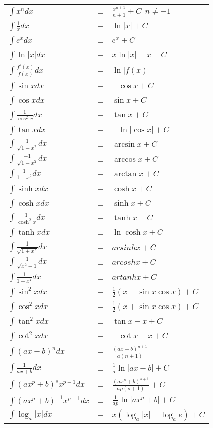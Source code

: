 \documentclass[10pt, a4paper, twocolumn]{scrartcl}
\begin{document}
\footnotesize
\begin{tabular}{lcl}
 $\int x^n dx$ & = &				$\frac{x^{n+1}}{n+1}+C\:\:n\neq -1$\\
 $\int \frac{1}{x} dx$ & = &			$\ln |x| +C$\\
 $\int e^x dx$ & = &				$e^x +C$\\
 $\int \ln |x| dx$ & = &			$x\ln |x| -x +C$\\
 $\int \frac{f'(x)}{f(x)}dx$ & = &		$\ln|f(x)|$\\
 $\int \sin x dx$ & = &				$-\cos x +C$\\
 $\int \cos x dx$ & = &				$\sin x +C$\\
 $\int \frac{1}{\cos^2 x}dx$ & = &		$\tan x +C$\\
 $\int \tan x dx$ & = &				$-\ln|\cos x|+C$\\
 $\int \frac{1}{\sqrt{1-x^2}}dx$ & = &	$\arcsin x +C$\\
 $\int \frac{-1}{\sqrt{1-x^2}}dx$ & = &	$\arccos x +C$\\
 $\int \frac{1}{1+x^2}dx$ & = &			$\arctan x +C$\\
 $\int \sinh x dx$ & = &			$\cosh x +C$\\
 $\int \cosh x dx$ & = &			$\sinh x +C$\\
 $\int \frac{1}{\cosh^2 x}dx$ & = &		$\tanh x +C$\\
 $\int \tanh x dx$ & = &			$\ln\cosh x + C$\\
 $\int \frac{1}{\sqrt{1+x^2}}dx$ & = &		$arsinh x + C$\\
 $\int \frac{1}{\sqrt{x^2-1}}dx$ & = &		$arcosh x + C$\\
 $\int \frac{1}{1-x^2}dx$ & = &			$artanh x + C$\\
 $\int \sin^2 x dx$ & = &			$\frac{1}{2}(x-\sin x \cos x) +C$\\
 $\int \cos^2 x dx$ & = &			$\frac{1}{2}(x+\sin x \cos x) +C$\\
 $\int \tan^2 x dx$ & = &			$\tan x-x +C$\\
 $\int \cot^2 x dx$ & = &			$-\cot x-x +C$\\
 $\int (ax+b)^ndx$ & = &			$\frac{(ax+b)^{n+1}}{a(n+1)}$\\
 $\int \frac{1}{ax+b}dx$ & = &			$\frac{1}{a}\ln|ax+b| +C$\\
 $\int (ax^p+b)^s x^{p-1}dx$ & = &		$\frac{(ax^p+b)^{s+1}}{ap(s+1)} +C$\\
 $\int (ax^p+b)^{-1} x^{p-1}dx$ & = &		$\frac{1}{ap}\ln |ax^p+b| +C$\\
 $\int \log_a |x|dx$ & = &			$x(\log_a|x|-\log_a e) +C$\\

\end{tabular}
\end{document}
